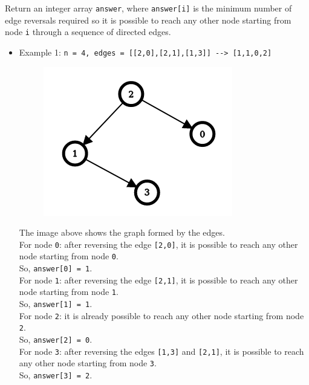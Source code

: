 Return an integer array {\colorbox{CodeBackground}{\lstinline|answer|}}, where {\colorbox{CodeBackground}{\lstinline|answer[i]|}} is the minimum number of edge reversals required so it is possible to reach any other node starting from node {\colorbox{CodeBackground}{\lstinline|i|}} through a sequence of directed edges.

\begin{itemize}
\item Example 1: {\colorbox{CodeBackground}{\lstinline|n = 4, edges = [[2,0],[2,1],[1,3]] --> [1,1,0,2]|}}
\begin{figure}[H]
\centering
\includegraphics[width=0.3\linewidth]{images/lc2858_eg1}
\label{fig:lc2858eg1}
\end{figure}
The image above shows the graph formed by the edges.\\
For node {\colorbox{CodeBackground}{\lstinline|0|}}: after reversing the edge {\colorbox{CodeBackground}{\lstinline|[2,0]|}}, it is possible to reach any other node starting from node {\colorbox{CodeBackground}{\lstinline|0|}}.\\
So, {\colorbox{CodeBackground}{\lstinline|answer[0] = 1|}}.\\
For node {\colorbox{CodeBackground}{\lstinline|1|}}: after reversing the edge {\colorbox{CodeBackground}{\lstinline|[2,1]|}}, it is possible to reach any other node starting from node {\colorbox{CodeBackground}{\lstinline|1|}}.\\
So, {\colorbox{CodeBackground}{\lstinline|answer[1] = 1|}}.\\
For node {\colorbox{CodeBackground}{\lstinline|2|}}: it is already possible to reach any other node starting from node {\colorbox{CodeBackground}{\lstinline|2|}}.\\
So, {\colorbox{CodeBackground}{\lstinline|answer[2] = 0|}}.\\
For node {\colorbox{CodeBackground}{\lstinline|3|}}: after reversing the edges {\colorbox{CodeBackground}{\lstinline|[1,3]|}} and {\colorbox{CodeBackground}{\lstinline|[2,1]|}}, it is possible to reach any other node starting from node {\colorbox{CodeBackground}{\lstinline|3|}}.\\
So, {\colorbox{CodeBackground}{\lstinline|answer[3] = 2|}}.

\end{itemize}
